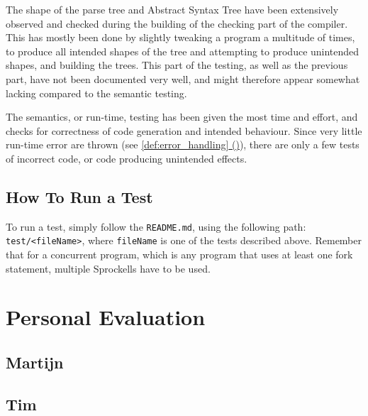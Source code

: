 \documentclass[twoside]{report}
\newcommand*{\fullref}[1]{\hyperref[{#1}]{\ref*{#1} (\nameref*{#1})}}
\begin{document}
The shape of the parse tree and Abstract Syntax Tree have been extensively observed and checked during the building of the checking part of the compiler. This has mostly been done by slightly tweaking a program a multitude of times, to produce all intended shapes of the tree and attempting to produce unintended shapes, and building the trees. This part of the testing, as well as the previous part, have not been documented very well, and might therefore appear somewhat lacking compared to the semantic testing.

The semantics, or run-time, testing has been given the most time and effort, and checks for correctness of code generation and intended behaviour. Since very little run-time error are thrown (see \fullref{def:error_handling}), there are only a few tests of incorrect code, or code producing unintended effects.


\section{How To Run a Test}
\label{how_to_run_a_test}
To run a test, simply follow the \texttt{README.md}, using the following path: \texttt{test/<fileName>}, where \texttt{fileName} is one of the tests described above. Remember that for a concurrent program, which is any program that uses at least one fork statement, multiple Sprockells have to be used.


\chapter{Personal Evaluation}
\label{personal_evaluation}
\section{Martijn}
\section{Tim}
\end{document}
